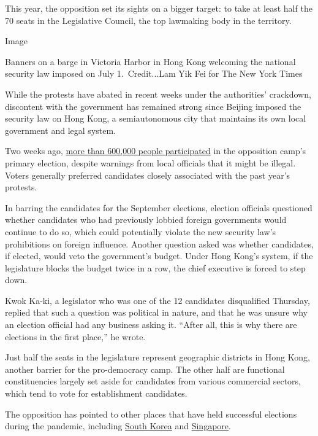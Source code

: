 This year, the opposition set its sights on a bigger target: to take at
least half the 70 seats in the Legislative Council, the top lawmaking
body in the territory.

Image

Banners on a barge in Victoria Harbor in Hong Kong welcoming the
national security law imposed on July 1.~Credit...Lam Yik Fei for The
New York Times

While the protests have abated in recent weeks under the authorities'
crackdown, discontent with the government has remained strong since
Beijing imposed the security law on Hong Kong, a semiautonomous city
that maintains its own local government and legal system.

Two weeks ago,
\href{https://www.nytimes.com/2020/07/13/world/asia/hong-kong-elections-security.html}{more
than 600,000 people participated} in the opposition camp's primary
election, despite warnings from local officials that it might be
illegal. Voters generally preferred candidates closely associated with
the past year's protests.

In barring the candidates for the September elections, election
officials questioned whether candidates who had previously lobbied
foreign governments would continue to do so, which could potentially
violate the new security law's prohibitions on foreign influence.
Another question asked was whether candidates, if elected, would veto
the government's budget. Under Hong Kong's system, if the legislature
blocks the budget twice in a row, the chief executive is forced to step
down.

Kwok Ka-ki, a legislator who was one of the 12 candidates disqualified
Thursday, replied that such a question was political in nature, and that
he was unsure why an election official had any business asking it.
``After all, this is why there are elections in the first place,'' he
wrote.

Just half the seats in the legislature represent geographic districts in
Hong Kong, another barrier for the pro-democracy camp. The other half
are functional constituencies largely set aside for candidates from
various commercial sectors, which tend to vote for establishment
candidates.

The opposition has pointed to other places that have held successful
elections during the pandemic, including
\href{https://www.nytimes.com/2020/04/10/world/asia/coronavirus-south-korea-election.html}{South
Korea} and
\href{https://www.nytimes.com/2020/07/10/world/asia/singapore-election-results.html}{Singapore}.

